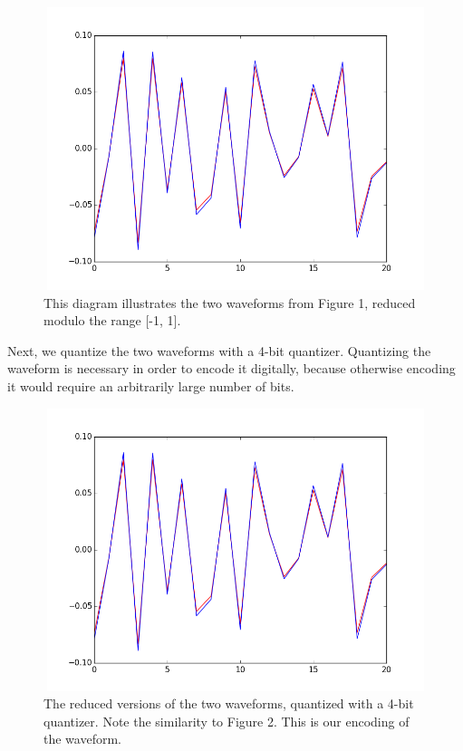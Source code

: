 \documentclass{amsart}
\begin{document}
\begin{figure}
\begin{center}
\includegraphics[height=3.25in,width=5in,angle=0]{originalsreduced.png} 
\caption{This diagram illustrates the two waveforms from Figure 1, reduced modulo the range [-1, 1].}
\end{center}
\end{figure}

Next, we quantize the two waveforms with a 4-bit quantizer. Quantizing the waveform is necessary in order to encode it digitally, because otherwise encoding it would require an arbitrarily large number of bits.\\

\begin{figure}
\begin{center}
\includegraphics[height=3.25in,width=5in,angle=0]{originalquantized.png} 
\caption{The reduced versions of the two waveforms, quantized with a 4-bit quantizer. Note the similarity to Figure 2. This is our encoding of the waveform.}
\end{center}
\end{figure}
\end{document}
